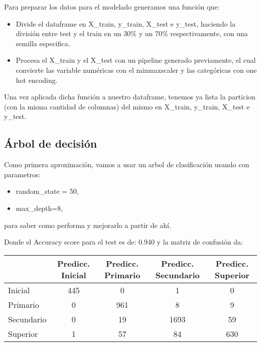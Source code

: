 \documentclass[a4paper]{article}
\begin{document}
        Para preparar los datos para el modelado generamos una función que:
        \begin{itemize}
            \item  Divide el dataframe en X\_train, y\_train, X\_test e y\_test, haciendo la división entre test y el train en un 30\% y un 70\% respectivamente, con una semilla especifica.
            \item  Procesa el X\_train y el X\_test con un pipeline generado previamente, el cual convierte las variable numéricas con el minmaxscaler y las categóricas con one hot encoding.
        \end{itemize}

        Una vez aplicada dicha función a nuestro dataframe, tenemos ya lista la particion (con la misma cantidad de columnas) del mismo en X\_train, y\_train, X\_test e y\_test.

    \subsection{Árbol de decisión}

        Como primera aproximación, vamos a usar un arbol de clasificación usando con parametros:
        \begin{itemize}
            \item random\_state = 50,
            \item max\_depth=8,
        \end{itemize}
        para saber como performa y mejorarlo a partir de ahí.

        Donde el Accuracy score para el test es de: 0.940 y la matriz de confusión da:
        \begin{table}[H]
            \centering
            \begin{tabular}{|l|c|c|c|c|}
            \hline
                ~ & Predicc. Inicial & Predicc. Primario & Predicc. Secundario & Predicc. Superior \\ \hline
                Inicial & 445 & 0 & 1 & 0 \\ \hline
                Primario & 0 & 961 & 8 & 9 \\ \hline
                Secundario & 0 & 19 & 1693 & 59 \\ \hline
                Superior & 1 & 57 & 84 & 630 \\ \hline
            \end{tabular}
        \end{table}
\end{document}
